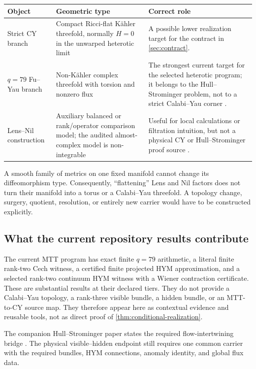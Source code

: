 \documentclass[11pt]{article}
\theoremstyle{definition}
\theoremstyle{remark}
\begin{document}
\begin{center}
\small
\begin{tabularx}{0.96\textwidth}{@{}p{}p{}X@{}}
\toprule
Object & Geometric type & Correct role \\
\midrule
Strict CY branch & Compact Ricci-flat K\"ahler threefold, normally \(H=0\)
in the unwarped heterotic limit & A possible lower realization target for
the contract in \cref{sec:contract}. \\
\(q=79\) Fu--Yau branch & Non-K\"ahler complex threefold with torsion and
nonzero flux & The strongest current target for the selected heterotic
program; it belongs to the Hull--Strominger problem, not to a strict
Calabi--Yau corner \cite{FuYau2008}. \\
Lens--Nil construction & Auxiliary balanced or rank/operator comparison
model; the audited almost-complex model is non-integrable & Useful for local
calculations or filtration intuition, but not a physical CY or
Hull--Strominger proof source \cite{NeroFluxAudit2026}. \\
\bottomrule
\end{tabularx}
\end{center}

A smooth family of metrics on one fixed manifold cannot change its
diffeomorphism type.  Consequently, ``flattening'' Lens and Nil factors does
not turn their manifold into a torus or a Calabi--Yau threefold.  A topology
change, surgery, quotient, resolution, or entirely new carrier would have to
be constructed explicitly.

\subsection{What the current repository results contribute}

The current MTT program has exact finite \(q=79\) arithmetic, a literal
finite rank-two Cech witness, a certified finite projected HYM approximation,
and a selected rank-two continuum HYM witness with a Wiener contraction
certificate.  These are substantial results at their declared tiers.  They
do not provide a Calabi--Yau topology, a rank-three visible bundle, a hidden
bundle, or an MTT-to-CY source map.  They therefore appear here as contextual
evidence and reusable tools, not as direct proof of
\cref{thm:conditional-realization}.

The companion Hull--Strominger paper states the required flow-intertwining
bridge \cite{NeroMTTStrominger2026}.  The physical visible--hidden endpoint
still requires one common carrier with the required bundles, HYM
connections, anomaly identity, and global flux data.
\end{document}
